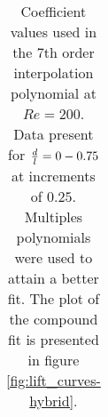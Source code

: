 \begin{table}[hb]
\begin{center}
\begin{tabular}{c c c c c c}
          
  
  
\hline %


\end{tabular}

\caption{Coefficient values used in the 7th order interpolation polynomial at $Re=200$. Data present for $\frac{d}{l}=0-0.75$ at increments of $0.25$. Multiples polynomials were used to attain a better fit. The plot of the compound fit is presented in figure \ref{fig:lift_curves-hybrid}.} 
 
\label{table:cy-coefficients-hybrid} %
\end{center}
\end{table}

